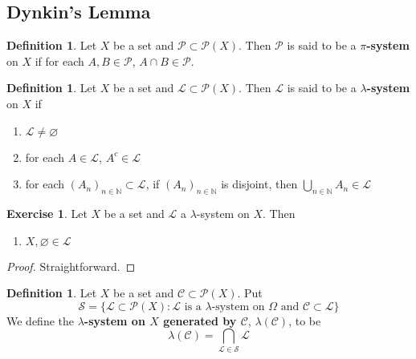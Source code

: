 \documentclass[12pt]{amsart}
\theoremstyle{definition}
\newtheorem{defn}[definition]{Definition}
\newtheorem{ex}[definition]{Exercise}
\newcommand{\lam}{\lambda}
\newcommand{\Om}{\Omega}
\newcommand{\N}{\mathbb{N}}
\newcommand{\MC}{\mathcal{C}}
\newcommand{\ML}{\mathcal{L}}
\newcommand{\MS}{\mathcal{S}}
\newcommand{\MP}{\mathcal{P}}
\begin{document}
	
	
	
	
	
	
	
	
	
	
	
	
	
	
	
	
	
	
	
	
	
	\newpage
	\subsection{Dynkin's Lemma}
	\begin{defn}
		Let $X$ be a set and $\MP \subset \MP(X)$. Then $\MP$ is said to be a \textbf{$\pi$-system} on $X$ if for each $A,B \in \MP$, $A \cap B \in \MP$.
	\end{defn}
	
	\begin{defn}
		Let $X$ be a set and $\ML \subset \MP(X)$. Then $\ML$ is said to be a \textbf{$\lam$-system} on $X$ if 
		\begin{enumerate}
			\item $\ML \neq \varnothing$
			\item for each $A \in \ML$, $A^c \in \ML$
			\item for each $(A_n)_{n \in \N} \subset \ML$, if $(A_n)_{n \in \N}$ is disjoint, then $\bigcup\limits_{n \in \N}A_n \in \ML$
		\end{enumerate}
	\end{defn}
	
	\begin{ex}
		Let $X$ be a set and $\ML$ a $\lam$-system on $X$. Then 
		\begin{enumerate}
			\item $X, \varnothing \in \ML$
		\end{enumerate} 
	\end{ex}
	
	\begin{proof}
		Straightforward.
	\end{proof}
	
	\begin{defn}
		Let $X$ be a set and $\MC \subset \MP(X)$. Put $$\MS = \{\ML \subset \MP(X): \ML \text{ is a }\lam\text{-system on }\Om \text{ and } \MC \subset \ML\}$$ We define the \textbf{$\lam$-system on $X$ generated by $\MC$}, $\lam(\MC)$, to be $$\lam(\MC) = \bigcap_{\ML \in \MS}\ML$$
	\end{defn}
	
\end{document}
